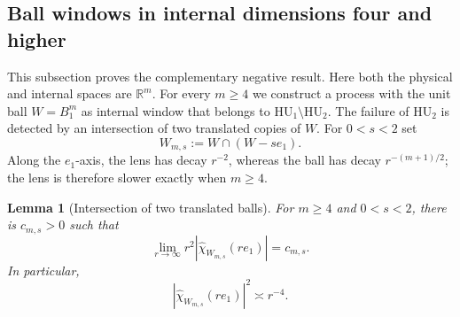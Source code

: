 \documentclass[11pt,reqno,a4paper]{amsart}
\numberwithin{equation}{section}
\theoremstyle{compact}
\newtheorem{lemma}[lemma]{Lemma}
\theoremstyle{definition}
\theoremstyle{definition}
\newcommand{\HU}{\mathrm{HU}}
\begin{document}
\subsection{Ball windows in internal dimensions four and higher}
\label{subsec:cap-critical-dimension}

This subsection proves the complementary negative result.  Here both the
physical and internal spaces are $\mathbb R^m$.  For every $m\geq4$ we
construct a process with the unit ball $W=B_1^m$ as internal window that
belongs to $\HU_1\setminus\HU_2$.  The failure of $\HU_2$ is detected by
an intersection of two translated copies of $W$.  For $0<s<2$ set
\begin{equation}\label{eq:cap-lens-definition}
  W_{m,s}:=W\cap(W-se_1).
\end{equation}
Along the $e_1$-axis, the lens has decay $r^{-2}$, whereas the ball has
decay $r^{-(m+1)/2}$; the lens is therefore slower exactly when $m\geq4$.

\begin{lemma}[Intersection of two translated balls]
\label{lem:cap-lens-fourier}
For \(m\geq4\) and \(0<s<2\), there is \(c_{m,s}>0\) such that
\begin{equation}\label{eq:cap-lens-axial-asymptotic}
  \lim_{r\to\infty} r^2
  |\widehat{\chi}_{W_{m,s}}(re_1)|=c_{m,s}.
\end{equation}
In particular,
\begin{equation}\label{eq:cap-lens-intensity-asymptotic}
  |\widehat{\chi}_{W_{m,s}}(re_1)|^2\asymp r^{-4}.
\end{equation}
\end{lemma}
\end{document}
